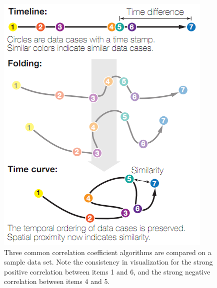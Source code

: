\begin{figure}[h]
\centering
    \includegraphics[width=\columnwidth]{images/time_curve_example.png}
    \caption{Three common correlation coefficient algorithms are compared on a sample data set. Note the consistency in visualization for the strong positive correlation between items 1 and 6, and the strong negative correlation between items 4 and 5.}
    \label{fig:time_curve_example}
\end{figure}


\subsection{}

\subsection{}

\subsection{}

